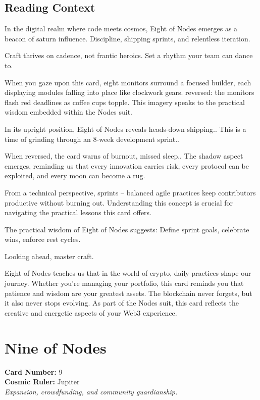 \documentclass[11pt,oneside]{book}
\begin{document}
\begin{minipage}[t]{0.55\textwidth}
  \subsection*{Reading Context}
  In the digital realm where code meets cosmos, Eight of Nodes emerges as a beacon of saturn influence. Discipline, shipping sprints, and relentless iteration.

  Craft thrives on cadence, not frantic heroics. Set a rhythm your team can dance to.

  When you gaze upon this card, eight monitors surround a focused builder, each displaying modules falling into place like clockwork gears. reversed: the monitors flash red deadlines as coffee cups topple. This imagery speaks to the practical wisdom embedded within the Nodes suit.

  In its upright position, Eight of Nodes reveals heads-down shipping.. This is a time of grinding through an 8-week development sprint..

  When reversed, the card warns of burnout, missed sleep.. The shadow aspect emerges, reminding us that every innovation carries risk, every protocol can be exploited, and every moon can become a rug.

  From a technical perspective, sprints – balanced agile practices keep contributors productive without burning out. Understanding this concept is crucial for navigating the practical lessons this card offers.

  The practical wisdom of Eight of Nodes suggests: Define sprint goals, celebrate wins, enforce rest cycles.

  Looking ahead, master craft.

  Eight of Nodes teaches us that in the world of crypto, daily practices shape our journey. Whether you're managing your portfolio, this card reminds you that patience and wisdom are your greatest assets. The blockchain never forgets, but it also never stops evolving. As part of the Nodes suit, this card reflects the creative and energetic aspects of your Web3 experience.

\end{minipage}

\newpage
\section*{Nine of Nodes}

\begin{minipage}[t]{0.55\textwidth}
  \vspace{0pt}
  \textbf{Card Number:} 9\\  \textbf{Cosmic Ruler:} Jupiter\\  \textit{Expansion, crowdfunding, and community guardianship.}
\end{minipage}
\end{document}
